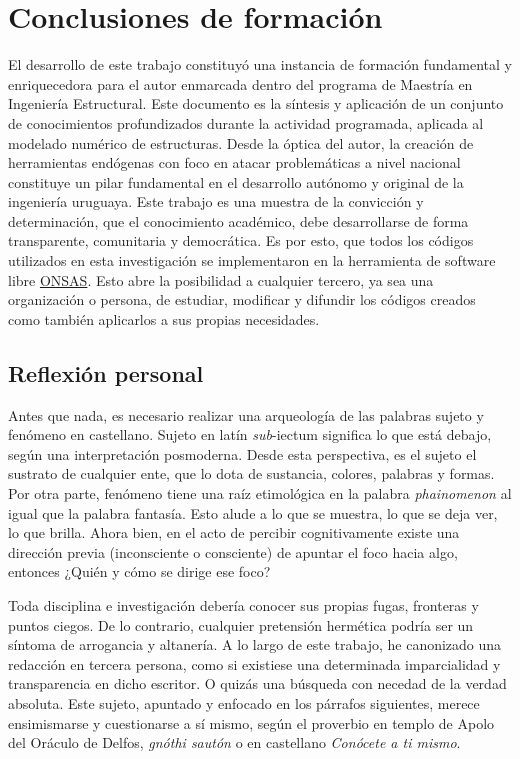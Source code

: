 \section{Conclusiones de formación}
El desarrollo de este trabajo constituyó una instancia de formación fundamental y enriquecedora para el autor enmarcada dentro del programa de Maestría en Ingeniería Estructural. Este documento es la síntesis y aplicación de un conjunto de conocimientos profundizados durante la actividad programada, aplicada al modelado numérico de estructuras. Desde la óptica del autor, la creación de herramientas endógenas con foco en atacar problemáticas a nivel nacional constituye un pilar fundamental en el desarrollo autónomo y original de la ingeniería uruguaya. Este trabajo es una muestra de la convicción y determinación, que el conocimiento académico, debe desarrollarse de forma transparente, comunitaria y democrática. Es por esto, que todos los códigos utilizados en esta investigación se implementaron en la herramienta de software libre \href{https://github.com/ONSAS/ONSAS/}{ONSAS}. Esto abre la posibilidad a cualquier tercero, ya sea una organización o persona, de estudiar, modificar y difundir los códigos creados como también aplicarlos a sus propias necesidades. 
\subsection{Reflexión personal}
Antes que nada, es necesario realizar una arqueología de las palabras sujeto y fenómeno en castellano. Sujeto en latín \emph{sub}-{iectum} significa lo que está debajo, según una interpretación posmoderna. Desde esta perspectiva, es el sujeto el sustrato de cualquier ente, que lo dota de sustancia, colores, palabras y formas. Por otra parte, fenómeno tiene una raíz etimológica en la palabra \emph{phainomenon} al igual que la palabra fantasía. Esto alude a lo que se muestra, lo que se deja ver, lo que brilla. Ahora bien, en el acto de percibir cognitivamente existe una dirección previa (inconsciente o consciente) de apuntar el foco hacia algo, entonces ¿Quién y cómo se dirige ese foco?

Toda disciplina e investigación debería conocer sus propias fugas, fronteras y puntos ciegos. De lo contrario, cualquier pretensión hermética podría ser un síntoma de arrogancia y altanería.  A lo largo de este trabajo, he canonizado una redacción en tercera persona, como si existiese una determinada imparcialidad y transparencia en dicho escritor. O quizás una búsqueda con necedad de la verdad absoluta. Este sujeto, apuntado y enfocado en los párrafos siguientes, merece ensimismarse y cuestionarse a sí mismo, según el proverbio en templo de Apolo del Oráculo de Delfos, \emph{gnóthi sautón} o en castellano \emph{Conócete a ti mismo}.

